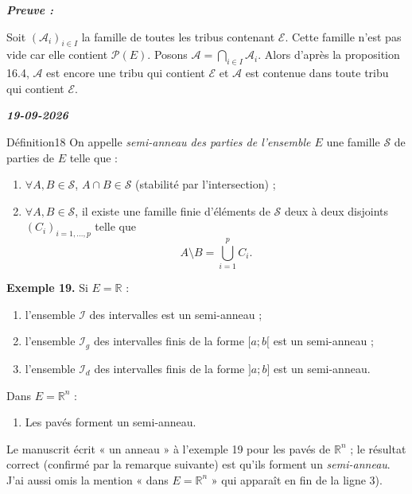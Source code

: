 \documentclass[11pt,a4paper]{article}
\newcommand{\R}{\mathbb{R}}
\newcommand{\A}{\mathscr{A}}
\newcommand{\Pp}{\mathscr{P}}
\newcommand{\Ee}{\mathscr{E}}
\newcommand{\Ss}{\mathscr{S}}
\newcommand{\Ii}{\mathscr{I}}
\newenvironment{preuve}{\par\textit{\textbf{Preuve :}}\par\nopagebreak[4]}{\par}
\newcommand{\datepage}[1]{\begin{flushright}\small\bfseries\itshape\color{bleuclair}#1\end{flushright}\vspace{-8pt}}
\begin{document}
\begin{preuve}\end{preuve}
Soit $(\A_i)_{i\in I}$ la famille de toutes les tribus contenant $\Ee$. Cette famille n'est pas vide car elle
contient $\Pp(E)$. Posons $\A=\bigcap_{i\in I}\A_i$. Alors d'après la proposition 16.4, $\A$ est encore une tribu
qui contient $\Ee$ et $\A$ est contenue dans toute tribu qui contient $\Ee$.

\datepage{19-09-2026}


\begin{enonce}{Définition}{18}
On appelle \emph{semi-anneau des parties de l'ensemble $E$} une famille $\Ss$ de parties de $E$ telle que :
\begin{enumerate}[label=\textbf{\arabic*)},leftmargin=1.2cm]
  \item $\forall A,B\in\Ss$, $A\cap B\in\Ss$ (stabilité par l'intersection) ;
  \item $\forall A,B\in\Ss$, il existe une famille finie d'éléments de $\Ss$ deux à deux disjoints
        $(C_i)_{i=1,\dots,p}$ telle que
        \[
          A\setminus B=\bigcup_{i=1}^{p}C_i .
        \]
\end{enumerate}
\end{enonce}

\textbf{\color{bleu}Exemple 19.} Si $E=\R$ :
\begin{enumerate}[label=\textbf{\arabic*)},leftmargin=1.2cm]
  \item l'ensemble $\Ii$ des intervalles est un semi-anneau ;
  \item l'ensemble $\Ii_g$ des intervalles finis de la forme $[a;b[$ est un semi-anneau ;
  \item l'ensemble $\Ii_d$ des intervalles finis de la forme $]a;b]$ est un semi-anneau.
\end{enumerate}
Dans $E=\R^n$ :
\begin{enumerate}[label=\textbf{\arabic*)},leftmargin=1.2cm]
  \item Les pavés forment un semi-anneau.
\end{enumerate}

\begin{note}
Le manuscrit écrit « un anneau » à l'exemple 19 pour les pavés de $\R^n$ ; le résultat correct (confirmé
par la remarque suivante) est qu'ils forment un \emph{semi-anneau}. J'ai aussi omis la mention « dans $E=\R^n$ »
qui apparaît en fin de la ligne 3).
\end{note}
\end{document}
